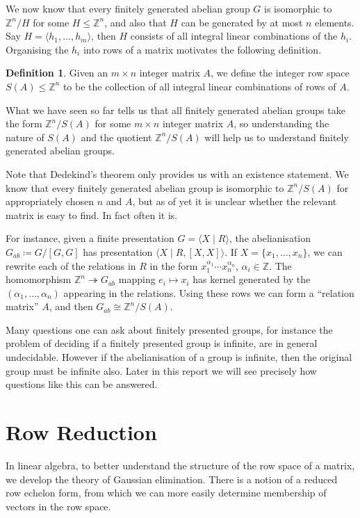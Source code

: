 \documentclass[12pt,a4paper]{article}
\newcommand{\Z}{\mathbb{Z}}
\theoremstyle{definition}
\newtheorem{definition}[theorem]{Definition}
\begin{document}
We now know that every finitely generated abelian group $G$ is isomorphic to $\Z^n/H$ for some $H\leq\Z^n$, and also that $H$ can be generated by at most $n$ elements. Say $H=\langle h_1,\ldots,h_m \rangle$, then $H$ consists of all integral linear combinations of the $h_i$. Organising the $h_i$ into rows of a matrix motivates the following definition.

\begin{definition}
  Given an $m\times n$ integer matrix $A$, we define the integer row space $S(A)\leq\Z^n$ to be the collection of all integral linear combinations of rows of $A$.
\end{definition}

What we have seen so far tells us that all finitely generated abelian groups take the form $\Z^n/S(A)$ for some $m\times n$ integer matrix $A$, so understanding the nature of $S(A)$ and the quotient $\Z^n/S(A)$ will help us to understand finitely generated abelian groups.

Note that Dedekind's theorem only provides us with an existence statement. We know that every finitely generated abelian group is isomorphic to $\Z^n/S(A)$ for appropriately chosen $n$ and $A$, but as of yet it is unclear whether the relevant matrix is easy to find. In fact often it is.

For instance, given a finite presentation $G=\langle X \mid R \rangle$, the abelianisation $G_{ab}\coloneqq G/[G,G]$ has presentation $\langle X \mid R, [X,X] \rangle$. If $X=\{x_1,\ldots,x_n\}$, we can rewrite each of the relations in $R$ in the form $x_1^{\alpha_1}\cdots x_n^{\alpha_n}$, $\alpha_i\in\Z$. The homomorphism $\Z^n\twoheadrightarrow G_{ab}$ mapping $e_i\mapsto x_i$ has kernel generated by the $(\alpha_1,\ldots,\alpha_n)$ appearing in the relations. Using these rows we can form a ``relation matrix'' $A$, and then $G_{ab}\cong\Z^n/S(A)$.

Many questions one can ask about finitely presented groups, for instance the problem of deciding if a finitely presented group is infinite, are in general undecidable. However if the abelianisation of a group is infinite, then the original group must be infinite also. Later in this report we will see precisely how questions like this can be answered.

\section{Row Reduction}

In linear algebra, to better understand the structure of the row space of a matrix, we develop the theory of Gaussian elimination. There is a notion of a reduced row echelon form, from which we can more easily determine membership of vectors in the row space.
\end{document}
